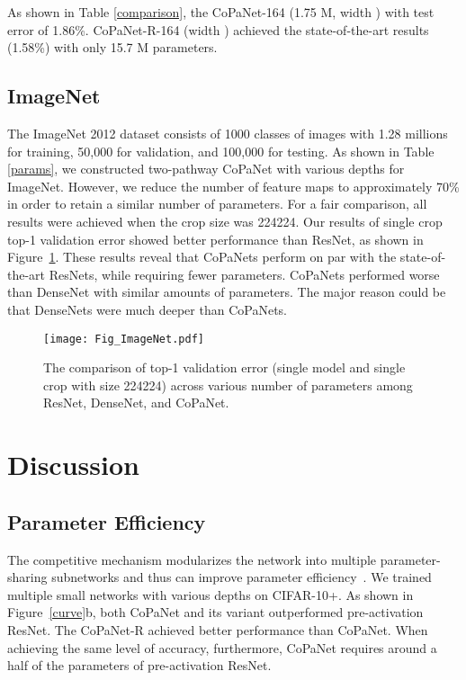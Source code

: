 \documentclass[wcp]{jmlr}
\begin{document}
As shown in Table \ref{comparison}, the CoPaNet-164 (1.75 M, width ) with test error of 1.86\%. 
CoPaNet-R-164 (width ) achieved the state-of-the-art results (1.58\%) with only 15.7 M parameters.

\subsection{ImageNet}
The ImageNet 2012 dataset consists of 1000 classes of images with 1.28 millions for training, 50,000 for validation, and 100,000 for testing. 
As shown in Table \ref{params}, we constructed two-pathway CoPaNet with various depths for ImageNet. 
However, we reduce the number of feature maps to approximately 70\% in order to retain a similar number of parameters. 
For a fair comparison, all results were achieved when the crop size was 224224. 
Our results of single crop top-1 validation error showed better performance than ResNet, as shown in Figure~\ref{imagenet}.
These results reveal that CoPaNets perform on par with the state-of-the-art ResNets, while requiring fewer parameters.
CoPaNets performed worse than DenseNet with similar amounts of parameters.
The major reason could be that DenseNets were much deeper than CoPaNets.


\begin{figure}
\centering
\texttt{[image: Fig\_ImageNet.pdf]}
\caption{The comparison of top-1 validation error (single model and single crop with size 224224)  across various number of parameters among ResNet, DenseNet, and CoPaNet. }
\label{imagenet}
\end{figure}







\section{Discussion}

\subsection{Parameter Efficiency}
The competitive mechanism modularizes the network into multiple parameter-sharing subnetworks and thus can improve parameter efficiency~\citep{srivastava2013compete}.
We trained multiple small networks with various depths on CIFAR-10+.
As shown in Figure~\ref{curve}b, both CoPaNet and its variant outperformed pre-activation ResNet.
The CoPaNet-R achieved better performance than CoPaNet.
When achieving the same level of accuracy, furthermore, CoPaNet requires around a half of the parameters of pre-activation ResNet.
\end{document}
